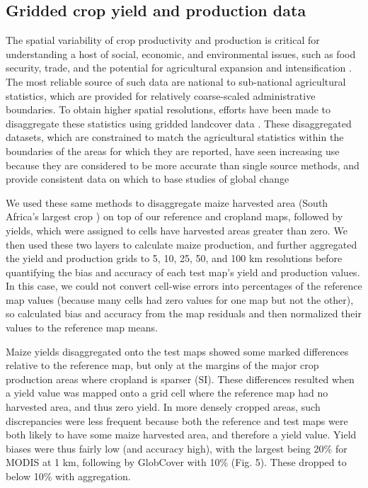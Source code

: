 \documentclass{pnastwo}
\begin{document}
\begin{article}
\subsection{Gridded crop yield and production data}
The spatial variability of crop productivity and production is critical for understanding a host of social, economic, and environmental issues, such as food security, trade, and the potential for agricultural expansion and intensification \cite{licker_mind_2010,monfreda_farming_2008}. The most reliable source of such data are national to sub-national agricultural statistics, which are provided for relatively coarse-scaled administrative boundaries. To obtain higher spatial resolutions, efforts have been made to disaggregate these statistics using gridded landcover data \cite{ramankutty_farming_2008,monfreda_farming_2008}. These disaggregated datasets, which are constrained to match the agricultural statistics within the boundaries of the areas for which they are reported, have seen increasing use because they are considered to be more accurate than single source methods, and provide consistent data on which to base studies of global change \cite{ramankutty_farming_2008, see_improved_2015}

We used these same methods  \cite{ramankutty_farming_2008,monfreda_farming_2008} to disaggregate maize harvested area (South Africa's largest crop \cite{estes_projected_2013}) on top of our reference and cropland maps, followed by yields, which were assigned to cells have harvested areas greater than zero. We then used these two layers to calculate maize production, and further aggregated the yield and production grids to 5, 10, 25, 50, and 100 km resolutions before quantifying the bias and accuracy of each test map's yield and production values. In this case, we could not convert cell-wise errors into percentages of the reference map values (because many cells had zero values for one map but not the other), so calculated bias and accuracy from the map residuals and then normalized their values to the reference map means. 

Maize yields disaggregated onto the test maps showed some marked differences relative to the reference map, but only at the margins of the major crop production areas where cropland is sparser (SI). These differences resulted when a yield value was mapped onto a grid cell where the reference map had no harvested area, and thus zero yield. In more densely cropped areas, such discrepancies were less frequent because both the reference and test maps were both likely to have some maize harvested area, and therefore a yield value.  Yield biases were thus fairly low (and accuracy high), with the largest being 20\% for MODIS at 1 km, following by GlobCover with 10\% (Fig. 5). These dropped to below 10\% with aggregation.  


\end{article}
\end{document}
